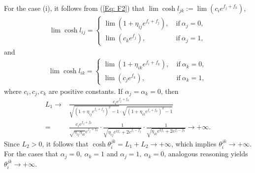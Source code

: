 \documentclass[12pt]{amsart}
\theoremstyle{definition}
\begin{document}
For the case (i), it follows from (\ref{Eq: F2}) that $\lim\cosh l_{jk}:=\lim (c_ie^{f_j+f_k})$,
\begin{eqnarray*}
\lim\cosh l_{ij}=
\begin{cases}
\lim(1+\eta_{ij}e^{f_i+f_j}),\ & \text{if}\ \alpha_j=0,  \\
\lim(c_ke^{f_j}),\ & \text{if}\ \alpha_j=1,
\end{cases}
\end{eqnarray*}
and
\begin{eqnarray*}
\lim\cosh l_{ik}=
\begin{cases}
\lim(1+\eta_{ik}e^{f_i+f_k}),\ & \text{if}\ \alpha_k=0,  \\
\lim(c_je^{f_k}),\ & \text{if}\ \alpha_k=1,
\end{cases}
\end{eqnarray*}
where $c_i,c_j,c_k$ are positive constants.
If $\alpha_j=\alpha_k=0$, then
\begin{equation*}
\begin{aligned}
L_1\rightarrow &\frac{c_ie^{f_j+f_k}}
{\sqrt{(1+\eta_{ij}e^{f_i+f_j})^2-1}\cdot
\sqrt{(1+\eta_{ik}e^{f_i+f_k})^2-1}}\\
=&\frac{c_ie^{f_j+f_k}}
{\sqrt{\eta_{ij}\eta_{ik}}e^{f_j+f_k}}\cdot
\frac{1}{\sqrt{\eta_{ij}e^{2f_i}+2e^{f_i-f_j}}}\cdot
\frac{1}{\sqrt{\eta_{ik}e^{2f_i}+2e^{f_i-f_k}}}
\rightarrow+\infty.
\end{aligned}
\end{equation*}
Since $L_2>0$, it follows that $\cosh \theta^{jk}_i=L_1+L_2\rightarrow +\infty$, 
which implies $\theta^{jk}_i\rightarrow +\infty$.
For the cases that $\alpha_j=0,\ \alpha_k=1$ and $\alpha_j=1,\ \alpha_k=0$, analogous reasoning yields   $\theta^{jk}_i\rightarrow +\infty$.
\end{document}
